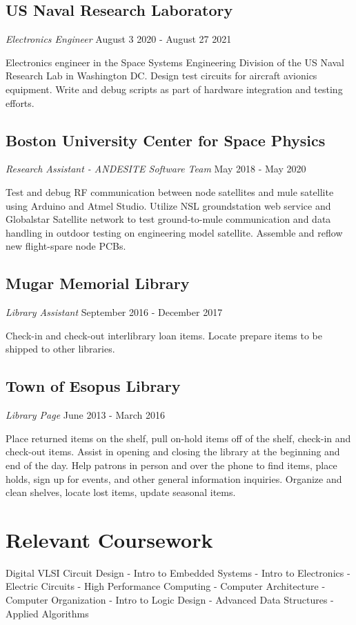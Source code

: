\documentclass{article}
\begin{document}
\subsection{US Naval Research Laboratory} \textit{Electronics Engineer}
  August 3 2020 - August 27 2021

Electronics engineer in the Space Systems Engineering Division of the US Naval Research Lab in Washington DC. Design test circuits for aircraft avionics equipment. Write and debug scripts as part of hardware integration and testing efforts.
\vspace{-.75em}
\subsection{Boston University Center for Space Physics}  \textit{Research Assistant - ANDESITE Software Team}
  May 2018 - May 2020

Test and debug RF communication between node satellites and mule satellite using Arduino and Atmel Studio. Utilize NSL groundstation web service and Globalstar Satellite network to test ground-to-mule communication and data handling in outdoor testing on engineering model satellite. Assemble and reflow new flight-spare node PCBs.
\vspace{-.75em}
\subsection{Mugar Memorial Library} \textit{Library Assistant}
  September 2016 - December 2017

Check-in and check-out interlibrary loan items. Locate prepare items to be shipped to other libraries.
\vspace{-.75em}
\subsection{Town of Esopus Library} \textit{Library Page}
  June 2013 - March 2016

Place returned items on the shelf, pull on-hold items off of the shelf, check-in and check-out items. Assist in opening and closing the library at the beginning and end of the day. Help patrons in person and over the phone to find items, place holds, sign up for events, and other general information inquiries. Organize and clean shelves, locate lost items, update seasonal items.

\vspace{-.75em}
\section{Relevant Coursework}
{\centering
Digital VLSI Circuit Design - Intro to Embedded Systems - Intro to Electronics - Electric Circuits - High Performance Computing - Computer Architecture - Computer Organization - Intro to Logic Design - Advanced Data Structures - Applied Algorithms
\par
}
\end{document}
